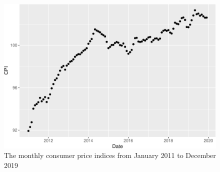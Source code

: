 \documentclass[
]{book}
\theoremstyle{definition}
\theoremstyle{definition}
\theoremstyle{definition}
\theoremstyle{definition}
\theoremstyle{remark}
\begin{document}
\begin{figure}

{\centering \includegraphics{SCMA266Bookdownproj_files/figure-latex/figCPI-1} 

}

\caption{The monthly consumer price indices from January 2011 to December 2019}\label{fig:figCPI}
\end{figure}
\end{document}
